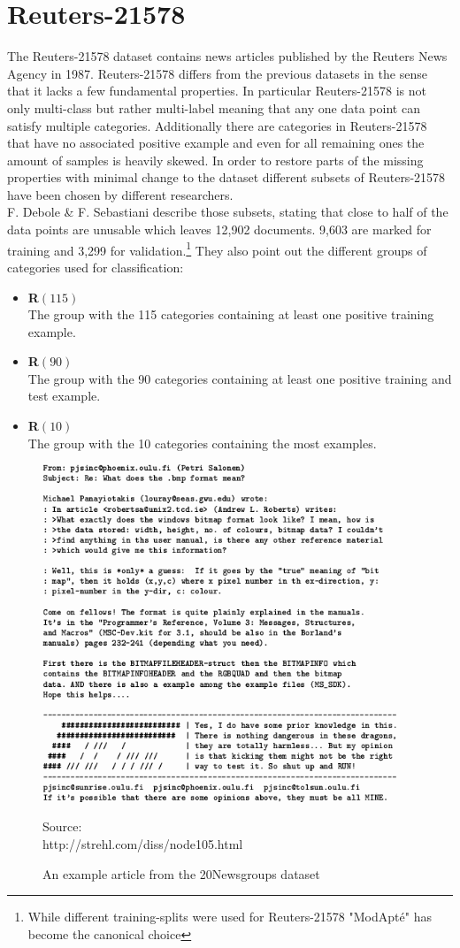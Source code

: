 \section{Reuters-21578}
The Reuters-21578 dataset contains news articles published by the Reuters News Agency in 1987. Reuters-21578 differs from the previous datasets in the sense that it lacks a few fundamental properties. In particular Reuters-21578 is not only multi-class but rather multi-label meaning that any one data point can satisfy multiple categories. Additionally there are categories in Reuters-21578 that have no associated positive example and even for all remaining ones the amount of samples is heavily skewed. In order to restore parts of the missing properties with minimal change to the dataset different subsets of Reuters-21578 have been chosen by different researchers.\\
F. Debole \& F. Sebastiani describe those subsets, stating that close to half of the data points are unusable which leaves 12,902 documents. 9,603 are marked for training and 3,299 for validation.\footnote{While different training-splits were used for Reuters-21578 "ModApt\'e" has become the canonical choice}\cite{Reuters-Subsets} They also point out the different groups of categories used for classification:
\begin{itemize}
	\item \textbf{R$\left(115\right)$}\\
	The group with the 115 categories containing at least one positive training example.\\ 
	\item \textbf{R$\left(90\right)$}\\
	The group with the 90 categories containing at least one positive training and test example.\\ 
	\item \textbf{R$\left(10\right)$}\\
	The group with the 10 categories containing the most examples. \\
\end{itemize} 


\begin{figure}
	\centering
	\includegraphics[width=400px]{gfx/6-Datasets/20Newsgroups_examples.png}
	\caption{An example article from the 20Newsgroups dataset}
	\vspace{7pt}
	\footnotesize{
		Source:\\
		http://strehl.com/diss/node105.html
	}
	\label{fig:20Newsgroups-Examples}
\end{figure}